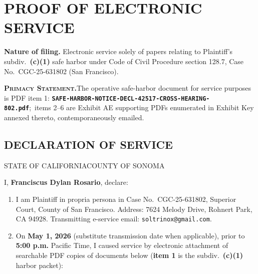 \newcommand{\docshorttitle}{POS-050 --- Safe Harbor Serv.\ (\textsection~128.7(c)(1)) CGC-25-631802}
\newcommand{\doctitleblock}{PROOF OF ELECTRONIC SERVICE (POS-050 / EFS-050 FORMAT)}
\newcommand{\docsubblock}{(Judicial Council POS-050 / EFS-050 [Rev.\ Feb.\ 1, 2017]\textemdash proof follows same operative elements as optional Judicial Council forms; Code Civ.\ Proc., \textsection\textsection~1010.6, 1013a; Cal.\ Rules of Court, rule 2.251)}




\section*{PROOF OF ELECTRONIC SERVICE}

\textbf{Nature of filing.} Electronic service solely of papers relating to Plaintiff's subdiv.\ \textbf{(c)(1)} safe harbor under Code of Civil Procedure section 128.7, Case No.\ CGC-25-631802 (San Francisco).\par\vspace{\baselineskip}

\textbf{\textsc{\small Primacy Statement.}}\quad The operative safe-harbor document for service purposes is PDF item 1: \textbf{\texttt{SAFE-HARBOR-NOTICE-DECL-42517-CROSS-HEARING-802.pdf}};\ items 2--6 are Exhibit A\textendash E supporting PDFs enumerated in Exhibit Key annexed thereto, contemporaneously emailed.

\subsection*{DECLARATION OF SERVICE}

STATE OF CALIFORNIA\hfill COUNTY OF SONOMA\vspace{\baselineskip}

I, \textbf{Franciscus Dylan Rosario}, declare:

\begin{enumerate}
\item I am Plaintiff in propria persona in Case No.\ CGC-25-631802, Superior Court, County of San Francisco. Address: 7624 Melody Drive, Rohnert Park, CA 94928. Transmitting e-service email: \texttt{soltrinox@gmail.com}.
\item On \textbf{May 1, 2026} (substitute transmission date when applicable), prior to \textbf{5:00 p.m.} Pacific Time, I caused service by electronic attachment of searchable PDF copies of documents below (\textbf{item 1} is the subdiv.\ \textbf{(c)(1)} harbor packet):\par\vspace{\baselineskip}
\end{enumerate}

